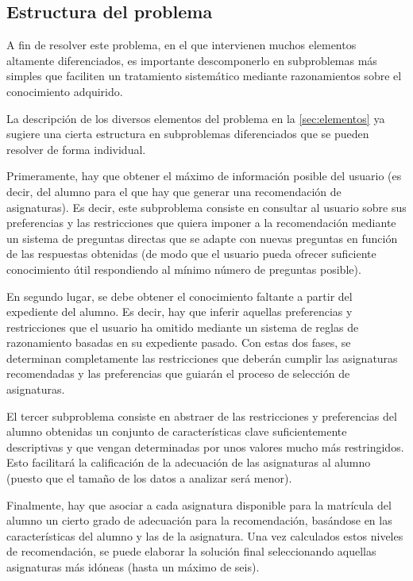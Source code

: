 
\subsection{Estructura del problema} \label{sec:subproblemas}

A fin de resolver este problema, en el que intervienen muchos elementos 
altamente diferenciados, es importante descomponerlo en subproblemas más 
simples que faciliten un tratamiento sistemático mediante razonamientos 
sobre el conocimiento adquirido. 

La descripción de los diversos elementos del problema en la 
\autoref{sec:elementos} ya sugiere una cierta estructura en subproblemas 
diferenciados que se pueden resolver de forma individual. 

Primeramente, hay que obtener el máximo de información posible del usuario 
(es decir, del alumno para el que hay que generar una recomendación de 
asignaturas). Es decir, este subproblema consiste en consultar al usuario 
sobre sus preferencias y las restricciones que quiera imponer a la 
recomendación mediante un sistema de preguntas directas que se adapte con 
nuevas preguntas en función de las respuestas obtenidas (de modo que el 
usuario pueda ofrecer suficiente conocimiento útil respondiendo al mínimo 
número de preguntas posible).

En segundo lugar, se debe obtener el conocimiento faltante a partir del 
expediente del alumno. Es decir, hay que inferir aquellas preferencias y 
restricciones que el usuario ha omitido mediante un sistema de reglas de 
razonamiento basadas en su expediente pasado. Con estas dos fases, se 
determinan completamente las restricciones que deberán cumplir las asignaturas 
recomendadas y las preferencias que guiarán el proceso de selección de 
asignaturas. 

El tercer subproblema consiste en abstraer de las restricciones y 
preferencias del alumno obtenidas un conjunto de características clave 
suficientemente descriptivas y que vengan determinadas por unos valores mucho 
más restringidos. Esto facilitará la calificación de la adecuación de las 
asignaturas al alumno (puesto que el tamaño de los datos a analizar será 
menor).

Finalmente, hay que asociar a cada asignatura disponible para la matrícula del 
alumno un cierto grado de adecuación para la recomendación, basándose en las 
características del alumno y las de la asignatura. Una vez calculados estos 
niveles de recomendación, se puede elaborar la solución final seleccionando 
aquellas asignaturas más idóneas (hasta un máximo de seis).





